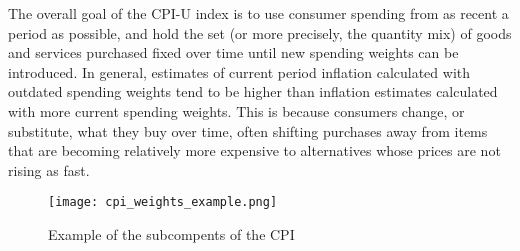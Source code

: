 \documentclass[12pt]{article}
\begin{document}
The overall goal of the CPI-U index is to use consumer spending from as recent a period as possible, and hold the set (or more precisely, the quantity mix) of goods and services purchased fixed over time until new spending weights can be introduced. In general, estimates of current period inflation calculated with outdated spending weights tend to be higher than inflation estimates calculated with more current spending weights. This is because consumers change, or substitute, what they buy over time, often shifting purchases away from items that are becoming relatively more expensive to alternatives whose prices are not rising as fast.


\begin{figure}[h]
    \centering
    \texttt{[image: cpi\_weights\_example.png]}
    \caption{Example of the subcompents of the CPI}
    \label{fig:cpisub}
\end{figure}
\end{document}
